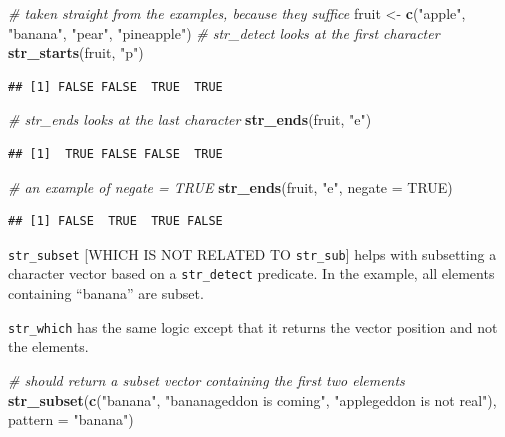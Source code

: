 \documentclass[]{book}
\newenvironment{Shaded}{}{}
\newcommand{\CommentTok}[1]{\textcolor[rgb]{0.38,0.63,0.69}{\textit{#1}}}
\newcommand{\DataTypeTok}[1]{\textcolor[rgb]{0.56,0.13,0.00}{#1}}
\newcommand{\KeywordTok}[1]{\textcolor[rgb]{0.00,0.44,0.13}{\textbf{#1}}}
\newcommand{\NormalTok}[1]{#1}
\newcommand{\OtherTok}[1]{\textcolor[rgb]{0.00,0.44,0.13}{#1}}
\newcommand{\StringTok}[1]{\textcolor[rgb]{0.25,0.44,0.63}{#1}}
\begin{document}
\begin{Shaded}
\begin{Highlighting}[]
\CommentTok{# taken straight from the examples, because they suffice}
\NormalTok{fruit <-}\StringTok{ }\KeywordTok{c}\NormalTok{(}\StringTok{"apple"}\NormalTok{, }\StringTok{"banana"}\NormalTok{, }\StringTok{"pear"}\NormalTok{, }\StringTok{"pineapple"}\NormalTok{)}
\CommentTok{# str_detect looks at the first character}
\KeywordTok{str_starts}\NormalTok{(fruit, }\StringTok{"p"}\NormalTok{)}
\end{Highlighting}
\end{Shaded}

\begin{verbatim}
## [1] FALSE FALSE  TRUE  TRUE
\end{verbatim}

\begin{Shaded}
\begin{Highlighting}[]
\CommentTok{# str_ends looks at the last character}
\KeywordTok{str_ends}\NormalTok{(fruit, }\StringTok{"e"}\NormalTok{)}
\end{Highlighting}
\end{Shaded}

\begin{verbatim}
## [1]  TRUE FALSE FALSE  TRUE
\end{verbatim}

\begin{Shaded}
\begin{Highlighting}[]
\CommentTok{# an example of negate = TRUE}
\KeywordTok{str_ends}\NormalTok{(fruit, }\StringTok{"e"}\NormalTok{, }\DataTypeTok{negate =} \OtherTok{TRUE}\NormalTok{)}
\end{Highlighting}
\end{Shaded}

\begin{verbatim}
## [1] FALSE  TRUE  TRUE FALSE
\end{verbatim}

\texttt{str\_subset} {[}WHICH IS NOT RELATED TO \texttt{str\_sub}{]} helps with subsetting a character vector based on a \texttt{str\_detect} predicate.
In the example, all elements containing ``banana'' are subset.

\texttt{str\_which} has the same logic except that it returns the vector position and not the elements.

\begin{Shaded}
\begin{Highlighting}[]
\CommentTok{# should return a subset vector containing the first two elements}
\KeywordTok{str_subset}\NormalTok{(}\KeywordTok{c}\NormalTok{(}\StringTok{"banana"}\NormalTok{,}
             \StringTok{"bananageddon is coming"}\NormalTok{,}
             \StringTok{"applegeddon is not real"}\NormalTok{),}
           \DataTypeTok{pattern =} \StringTok{"banana"}\NormalTok{)}
\end{Highlighting}
\end{Shaded}
\end{document}

